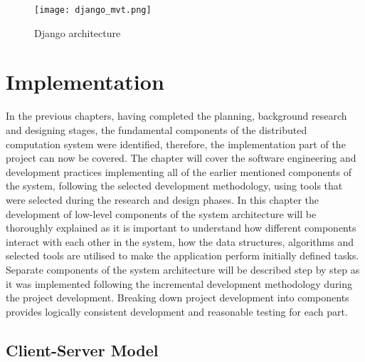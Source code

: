 \documentclass[10pt]{report}
\begin{document}
\begin{figure}[htp]
    \centering
    \texttt{[image: django\_mvt.png]}
    \caption{Django architecture}
    \label{mvt}
\end{figure}


\chapter{Implementation}

In the previous chapters, having completed the planning, background research and designing stages, the fundamental components  of the distributed computation system were identified, therefore, the implementation part of the project can now be covered. The chapter will cover the software engineering and development practices implementing all of the earlier mentioned components of the system, following the selected development methodology, using tools that were selected during the research and design phases. In this chapter the development of low-level components of the system architecture will be thoroughly explained as it is important to understand how different components interact with each other in the system, how the data structures, algorithms and selected tools are utilised to make the application perform initially defined tasks. Separate components of the system architecture will be described step by step as it was implemented following the incremental development methodology during the project development. Breaking down project development into components provides logically consistent development and reasonable testing for each part.

\section{Client-Server Model}
\end{document}
